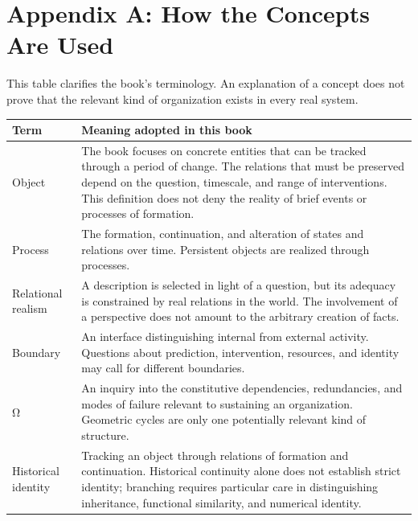 \documentclass[
  english,
  11pt,
  oneside]{book}
\newcounter{none} %
\begin{document}
\chapter{Appendix A: How the Concepts Are Used}\label{ph-app-a}

This table clarifies the book's terminology. An explanation of a concept does not prove that the relevant kind of organization exists in every real system.

{\def\LTcaptype{none} %
\begin{longtable}[]{@{}
  >{\raggedright\arraybackslash}p{}
  >{\raggedright\arraybackslash}p{}@{}}
\toprule\noalign{}
\begin{minipage}[b]{\linewidth}\raggedright
Term
\end{minipage} & \begin{minipage}[b]{\linewidth}\raggedright
Meaning adopted in this book
\end{minipage} \\
\midrule\noalign{}
\endhead
\bottomrule\noalign{}
\endlastfoot
Object & The book focuses on concrete entities that can be tracked through a period of change. The relations that must be preserved depend on the question, timescale, and range of interventions. This definition does not deny the reality of brief events or processes of formation. \\
Process & The formation, continuation, and alteration of states and relations over time. Persistent objects are realized through processes. \\
Relational realism & A description is selected in light of a question, but its adequacy is constrained by real relations in the world. The involvement of a perspective does not amount to the arbitrary creation of facts. \\
Boundary & An interface distinguishing internal from external activity. Questions about prediction, intervention, resources, and identity may call for different boundaries. \\
Ω & An inquiry into the constitutive dependencies, redundancies, and modes of failure relevant to sustaining an organization. Geometric cycles are only one potentially relevant kind of structure. \\
Historical identity & Tracking an object through relations of formation and continuation. Historical continuity alone does not establish strict identity; branching requires particular care in distinguishing inheritance, functional similarity, and numerical identity. \\

\end{longtable}}
\end{document}

